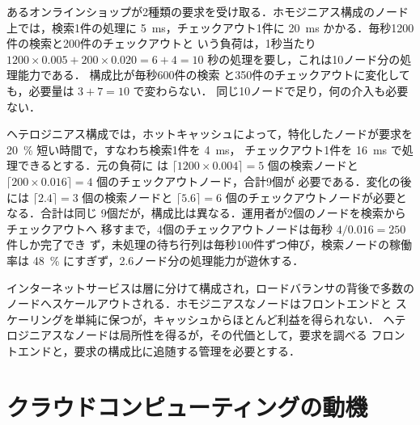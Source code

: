 \documentclass[../main.tex]{subfiles}
\begin{document}
\begin{example}
  \label{ex:l16-scaling}
  あるオンラインショップが2種類の要求を受け取る．ホモジニアス構成のノード
  上では，検索1件の処理に \SI{5}{\milli\second}，チェックアウト1件に
  \SI{20}{\milli\second} かかる．毎秒1200件の検索と200件のチェックアウトと
  いう負荷は，1秒当たり $1200 \times 0.005 + 200 \times 0.020 = 6 + 4 = 10$
  秒の処理を要し，これは10ノード分の処理能力である．%
  構成比が毎秒600件の検索
  と350件のチェックアウトに変化しても，必要量は $3 + 7 = 10$ で変わらない．
  同じ10ノードで足り，何の介入も必要ない．

  ヘテロジニアス構成では，ホットキャッシュによって，特化したノードが要求を
  \SI{20}{\percent} 短い時間で，すなわち検索1件を \SI{4}{\milli\second}，
  チェックアウト1件を \SI{16}{\milli\second} で処理できるとする．元の負荷に
  は $\lceil 1200 \times 0.004 \rceil = 5$ 個の検索ノードと
  $\lceil 200 \times 0.016 \rceil = 4$ 個のチェックアウトノード，合計9個が
  必要である．変化の後には $\lceil 2.4 \rceil = 3$ 個の検索ノードと
  $\lceil 5.6 \rceil = 6$ 個のチェックアウトノードが必要となる．合計は同じ
  9個だが，構成比は異なる．運用者が2個のノードを検索からチェックアウトへ
  移すまで，4個のチェックアウトノードは毎秒 $4/0.016 = 250$ 件しか完了でき
  ず，未処理の待ち行列は毎秒100件ずつ伸び，検索ノードの稼働率は
  \SI{48}{\percent} にすぎず，2.6ノード分の処理能力が遊休する．
\end{example}

\begin{keypoint}
  インターネットサービスは層に分けて構成され，ロードバランサの背後で多数の
  ノードへスケールアウトされる．ホモジニアスなノードはフロントエンドと
  スケーリングを単純に保つが，キャッシュからほとんど利益を得られない．
  ヘテロジニアスなノードは局所性を得るが，その代価として，要求を調べる
  フロントエンドと，要求の構成比に追随する管理を必要とする．
\end{keypoint}

\section{クラウドコンピューティングの動機}
\label{sec:l16-motivation}
\end{document}
